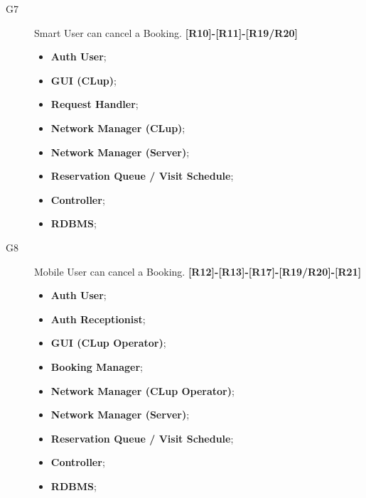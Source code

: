 \begin{description}
    \item[G7]Smart User can cancel a Booking. \textbf{[R10]-[R11]-[R19/R20]}
    \begin{itemize}
        \item \textbf{Auth User}; 
        \item \textbf{GUI (CLup)};  
        \item \textbf{Request Handler}; 
        \item \textbf{Network Manager (CLup)}; 
        \item \textbf{Network Manager (Server)};  
        \item \textbf{Reservation Queue / Visit Schedule};  
        \item \textbf{Controller};
        \item \textbf{RDBMS};
    \end{itemize}
    
    \item[G8]Mobile User can cancel a Booking. \textbf{[R12]-[R13]-[R17]-[R19/R20]-[R21]}
    \begin{itemize}
        \item \textbf{Auth User};
        \item \textbf{Auth Receptionist};
        \item \textbf{GUI (CLup Operator)};  
        \item \textbf{Booking Manager}; 
        \item \textbf{Network Manager (CLup Operator)}; 
        \item \textbf{Network Manager (Server)};  
        \item \textbf{Reservation Queue / Visit Schedule};  
        \item \textbf{Controller};
        \item \textbf{RDBMS};
    \end{itemize}
    
\end{description}